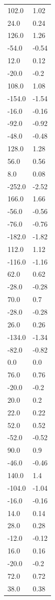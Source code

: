 \begin{longtable}{ll}
102.0 & 1.02 \\
24.0 & 0.24 \\
126.0 & 1.26 \\
-54.0 & -0.54 \\
12.0 & 0.12 \\
-20.0 & -0.2 \\
108.0 & 1.08 \\
-154.0 & -1.54 \\
-16.0 & -0.16 \\
-92.0 & -0.92 \\
-48.0 & -0.48 \\
128.0 & 1.28 \\
56.0 & 0.56 \\
8.0 & 0.08 \\
-252.0 & -2.52 \\
166.0 & 1.66 \\
-56.0 & -0.56 \\
-76.0 & -0.76 \\
-182.0 & -1.82 \\
112.0 & 1.12 \\
-116.0 & -1.16 \\
62.0 & 0.62 \\
-28.0 & -0.28 \\
70.0 & 0.7 \\
-28.0 & -0.28 \\
26.0 & 0.26 \\
-134.0 & -1.34 \\
-82.0 & -0.82 \\
0.0 & 0.0 \\
76.0 & 0.76 \\
-20.0 & -0.2 \\
20.0 & 0.2 \\
22.0 & 0.22 \\
52.0 & 0.52 \\
-52.0 & -0.52 \\
90.0 & 0.9 \\
-46.0 & -0.46 \\
140.0 & 1.4 \\
-104.0 & -1.04 \\
-16.0 & -0.16 \\
14.0 & 0.14 \\
28.0 & 0.28 \\
-12.0 & -0.12 \\
16.0 & 0.16 \\
-20.0 & -0.2 \\
72.0 & 0.72 \\
38.0 & 0.38 \\

\end{longtable}
